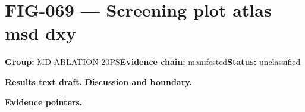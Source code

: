 \clearpage
\section{FIG-069 --- Screening plot atlas msd dxy}
\label{figpage:fig-069}
\textbf{Group:} MD-ABLATION-20PS\quad \textbf{Evidence chain:} manifested\quad \textbf{Status:} unclassified

\textbf{Results text draft.} 
\textbf{Discussion and boundary.} 


\textbf{Evidence pointers.}



\vfill
